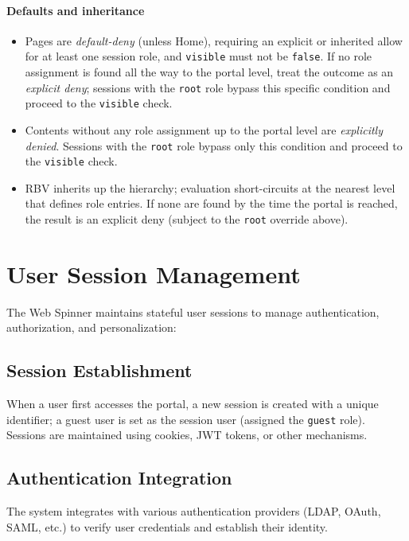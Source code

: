 \paragraph{Defaults and inheritance}
\begin{itemize}
		\item Pages are \emph{default-deny} (unless Home), requiring an explicit or inherited allow for at least one session role, and \texttt{visible} must not be \texttt{false}. If no role assignment is found all the way to the portal level, treat the outcome as an \emph{explicit deny}; sessions with the \texttt{root} role bypass this specific condition and proceed to the \texttt{visible} check.
		\item Contents without any role assignment up to the portal level are \emph{explicitly denied}. Sessions with the \texttt{root} role bypass only this condition and proceed to the \texttt{visible} check.
		\item RBV inherits up the hierarchy; evaluation short-circuits at the nearest level that defines role entries. If none are found by the time the portal is reached, the result is an explicit deny (subject to the \texttt{root} override above).
\end{itemize}

\section{User Session Management}
\label{sec:session-management}

The Web Spinner maintains stateful user sessions to manage authentication, authorization, and personalization:

\subsection{Session Establishment}

When a user first accesses the portal, a new session is created with a unique identifier; a guest user is set as the session user (assigned the \texttt{guest} role). Sessions are maintained using cookies, JWT tokens, or other mechanisms.

\subsection{Authentication Integration}

The system integrates with various authentication providers (LDAP, OAuth, SAML, etc.) to verify user credentials and establish their identity.

